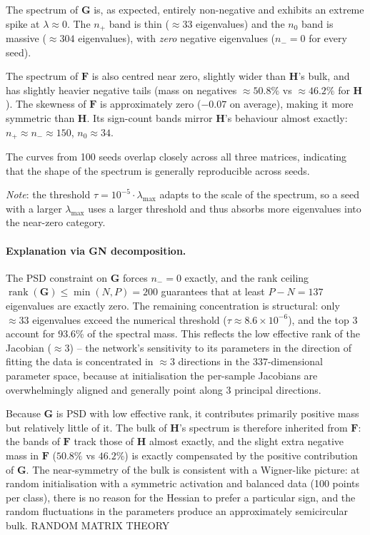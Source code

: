 \documentclass[12pt,a4paper]{article}
\newcommand{\rank}{\operatorname{rank}}
\newcommand{\bH}{\mathbf{H}}
\newcommand{\bG}{\mathbf{G}}
\newcommand{\bF}{\mathbf{F}}
\begin{document}
The spectrum of $\bG$ is, as expected, entirely non-negative and exhibits an extreme spike at $\lambda \approx 0$. The $n_+$ band is thin ($\approx 33$ eigenvalues) and the $n_0$ band is massive ($\approx 304$ eigenvalues), with \emph{zero} negative eigenvalues ($n_- = 0$ for every seed).

The spectrum of $\bF$ is also centred near zero, slightly wider than $\bH$'s bulk, and has slightly heavier negative tails (mass on negatives $\approx 50.8\%$ vs $\approx 46.2\%$ for $\bH$). The skewness of $\bF$ is approximately zero ($-0.07$ on average), making it more symmetric than $\bH$. Its sign-count bands mirror $\bH$'s behaviour almost exactly: $n_+ \approx n_- \approx 150$, $n_0 \approx 34$.

The curves from 100 seeds overlap closely across all three matrices, indicating that the shape of the spectrum is generally reproducible across seeds.

\emph{Note}: the threshold $\tau = 10^{-5} \cdot \lambda_{\max}$ adapts to the scale of the spectrum, so a seed with a larger $\lambda_{\max}$ uses a larger threshold and thus absorbs more eigenvalues into the near-zero category.

\paragraph{Explanation via GN decomposition.}
The PSD constraint on $\bG$ forces $n_- = 0$ exactly, and the rank ceiling $\rank(\bG) \leq \min(N, P) = 200$ guarantees that at least $P - N = 137$ eigenvalues are exactly zero. The remaining concentration is structural: only $\approx 33$ eigenvalues exceed the numerical threshold ($\tau \approx 8.6 \times 10^{-6}$), and the top 3 account for 93.6\% of the spectral mass. This reflects the low effective rank of the Jacobian ($\approx 3$) -- the network's sensitivity to its parameters in the direction of fitting the data is concentrated in $\approx 3$ directions in the $337$-dimensional parameter space, because at initialisation the per-sample Jacobians are overwhelmingly aligned and generally point along 3 principal directions.

Because $\bG$ is PSD with low effective rank, it contributes primarily positive mass but relatively little of it. The bulk of $\bH$'s spectrum is therefore inherited from $\bF$: the bands of $\bF$ track those of $\bH$ almost exactly, and the slight extra negative mass in $\bF$ ($50.8\%$ vs $46.2\%$) is exactly compensated by the positive contribution of $\bG$. The near-symmetry of the bulk is consistent with a Wigner-like picture: at random initialisation with a symmetric activation and balanced data (100 points per class), there is no reason for the Hessian to prefer a particular sign, and the random fluctuations in the parameters produce an approximately semicircular bulk. RANDOM MATRIX THEORY
\end{document}
